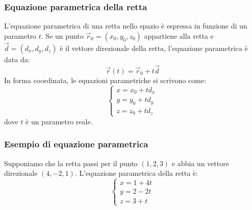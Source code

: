 \documentclass{article}
\begin{document}
\subsubsection{Equazione parametrica della retta}
L'equazione parametrica di una retta nello spazio è espressa in funzione di un parametro
\( t \). Se un punto \( \vec{r}_0 = (x_0, y_0, z_0) \) appartiene alla retta e
\( \vec{d} = (d_x, d_y, d_z) \) è il vettore direzionale della retta,
l'equazione parametrica è data da:
\[
    \vec{r}(t) = \vec{r}_0 + t \vec{d}
\]
In forma coordinata, le equazioni parametriche si scrivono come:
\[
    \begin{cases}
        x = x_0 + t d_x \\
        y = y_0 + t d_y \\
        z = z_0 + t d_z
    \end{cases}
\]
dove \( t \) è un parametro reale.

\subsubsection{Esempio di equazione parametrica}
Supponiamo che la retta passi per il punto \( (1, 2, 3) \) e abbia un vettore direzionale \( (4, -2, 1) \). L'equazione parametrica della retta è:
\[
    \begin{cases}
        x = 1 + 4t \\
        y = 2 - 2t \\
        z = 3 + t
    \end{cases}
\]
\end{document}
